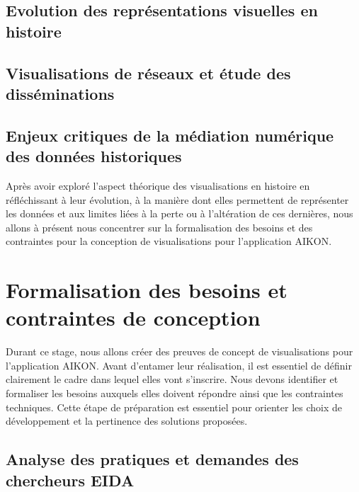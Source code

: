 \documentclass[a4paper,12pt,twoside]{book}
\newcommand{\clearemptydoublepage}{\newpage{\pagestyle{empty}\cleardoublepage}}
\begin{document}
	\section{Evolution des représentations visuelles en histoire}
	
	
	\section{Visualisations de réseaux et étude des disséminations}
	
	
	\section[La médiation numérique des données historiques]{Enjeux critiques de la médiation numérique des données historiques}
	
	
	Après avoir exploré l'aspect théorique des visualisations en histoire en réfléchissant à leur évolution, à la manière dont elles permettent de représenter les données et aux limites liées à la perte ou à l'altération de ces dernières, nous allons à présent nous concentrer sur la formalisation des besoins et des contraintes pour la conception de visualisations pour l'application AIKON.
	
	\clearemptydoublepage
	
	\chapter[Besoins et contraintes de conception]{Formalisation des besoins et contraintes de conception}
	
	Durant ce stage, nous allons créer des preuves de concept de visualisations pour l'application AIKON. Avant d'entamer leur réalisation, il est essentiel de définir clairement le cadre dans lequel elles vont s'inscrire. Nous devons identifier et formaliser les besoins auxquels elles doivent répondre ainsi que les contraintes techniques. Cette étape de préparation est essentiel pour orienter les choix de développement et la pertinence des solutions proposées.
	
	
	\section{Analyse des pratiques et demandes des chercheurs EIDA}
	
	
\end{document}
